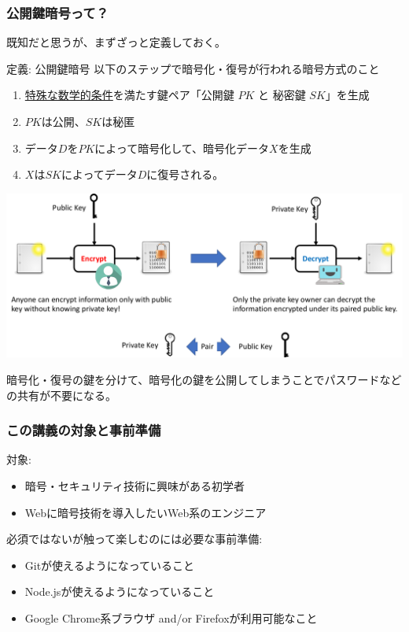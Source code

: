\documentclass[12pt,dvipdfmx]{beamer}
\begin{document}
\begin{frame}
\frametitle{公開鍵暗号って？}

既知だと思うが、まずざっと定義しておく。

\begin{block}{\small 定義: 公開鍵暗号}
\footnotesize
以下のステップで暗号化・復号が行われる暗号方式のこと
\begin{enumerate}
 \item \underline{特殊な数学的条件}を満たす鍵ペア「公開鍵 $\mathit{PK}$ と 秘密鍵 $\mathit{SK}$」を生成
 \item \alert{$\mathit{PK}$は公開、$\mathit{SK}$は秘匿}
 \item データ$D$を$\mathit{PK}$によって暗号化して、暗号化データ$X$を生成
 \item $X$は$\mathit{SK}$によってデータ$D$に復号される。
\end{enumerate}
\end{block}
\end{frame}

\begin{frame}
\begin{center}
\includegraphics[width=\linewidth]{Figs/pk_cryptosystem.pdf}
\end{center}

暗号化・復号の鍵を分けて、暗号化の鍵を公開してしまうことで\alert{パスワードなどの共有が不要}になる。
\end{frame}

\begin{frame}
\frametitle{この講義の対象と事前準備}
対象:
\begin{itemize}
\item 暗号・セキュリティ技術に興味がある初学者
\item Webに暗号技術を導入したいWeb系のエンジニア
\end{itemize}

\vspace{2ex}

必須ではないが触って楽しむのには必要な事前準備:
\begin{itemize}
\item Gitが使えるようになっていること
\item Node.jsが使えるようになっていること
\item Google Chrome系ブラウザ and/or Firefoxが利用可能なこと
\end{itemize}
\end{frame}
\end{document}
